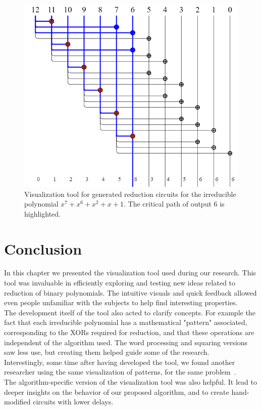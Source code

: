 \begin{figure}
  \caption{Visualization tool for generated reduction circuits for the irreducible polynomial $x^7 + x^6 + x^2 + x + 1$. The critical path of output 6 is highlighted.}
  \label{fig:circuit_reducing_critical_7_6_1_0}
  \centering
  \includegraphics[width = .8\columnwidth]{figures/reducing-critical-7-6-2-1-0.png}
\end{figure}

\section{Conclusion} \label{section:visual:conclusion}

In this chapter we presented the visualization tool used during our research. This tool was invaluable in efficiently exploring and testing new ideas related to reduction of binary polynomials. The intuitive visuals and quick feedback allowed even people unfamiliar with the subjects to help find interesting properties. \\

The development itself of the tool also acted to clarify concepts. For example the fact that each irreducible polynomial has a mathematical "pattern" associated, corresponding to the XORs required for reduction, and that these operations are independent of the algorithm used. The word processing and squaring versions saw less use, but creating them helped guide some of the research. \\

Interestingly, some time after having developed the tool, we found another researcher using the same visualization of patterns, for the same problem~\cite{paper_com_imagens_dos_padroes}. \\ %

The algorithm-specific version of the visualization tool was also helpful. It lead to deeper insights on the behavior of our proposed algorithm, and to create hand-modified circuits with lower delays.